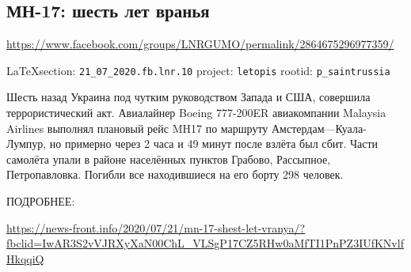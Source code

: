  
 
\subsection{МН-17: шесть лет вранья}
\label{sec:21_07_2020.fb.lnr.10}
\url{https://www.facebook.com/groups/LNRGUMO/permalink/2864675296977359/}
  
\vspace{0.5cm}
{\small\LaTeX section: \verb|21_07_2020.fb.lnr.10| project: \verb|letopis| rootid: \verb|p_saintrussia|}
\vspace{0.5cm}

 
Шесть назад Украина под чутким руководством Запада и США, совершила террористический акт.
Авиалайнер Boeing 777-200ER авиакомпании Malaysia Airlines выполнял плановый рейс MH17 по маршруту Амстердам—Куала-Лумпур, но примерно через 2 часа и 49 минут после взлёта был сбит.
Части самолёта упали в районе населённых пунктов Грабово, Рассыпное, Петропавловка.
Погибли все находившиеся на его борту 298 человек.

ПОДРОБНЕЕ:

\url{https://news-front.info/2020/07/21/mn-17-shest-let-vranya/?fbclid=IwAR3S2vVJRXyXaN00ChL_VLSgP17CZ5RHw0aMfTI1PnPZ3IUfKNvlfHkqqiQ}

